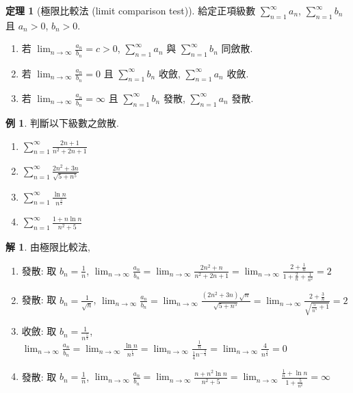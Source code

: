 \documentclass[12pt]{extarticle}
\newcommand{\ds}{\displaystyle}
\theoremstyle{definition}
\newtheorem*{thm}{定理}
\newtheorem*{ex}{例}
\newtheorem*{sol}{解}
\begin{document}
\begin{thm}[極限比較法 (limit comparison test)]
  給定正項級數 $\ds\sum_{n = 1}^\infty a_n$, $\ds\sum_{n = 1}^\infty b_n$ 且 $\ds a_n > 0$, $\ds b_n > 0$. 
  \begin{enumerate}\setlength{\itemsep}{0pt}
    \item 若 $\ds\lim_{n\to\infty}\frac{a_n}{b_n} = c > 0$, $\ds\sum_{n = 1}^\infty a_n$ 與 $\ds\sum_{n = 1}^\infty b_n$ 同斂散. 
    \item 若 $\ds\lim_{n\to\infty}\frac{a_n}{b_n} = 0$ 且 $\ds\sum_{n = 1}^\infty b_n$ 收斂, $\ds\sum_{n = 1}^\infty a_n$ 收斂. 
    \item 若 $\ds\lim_{n\to\infty}\frac{a_n}{b_n} = \infty$ 且 $\ds\sum_{n = 1}^\infty b_n$ 發散, $\ds\sum_{n = 1}^\infty a_n$ 發散. 
  \end{enumerate}
\end{thm}

\begin{ex} 判斷以下級數之斂散. 
  \begin{multicols}{4}
    \begin{enumerate}\setlength{\itemsep}{0pt}
      \item $\ds\sum_{n = 1}^\infty\frac{2 n + 1}{n^2 + 2n + 1}$
      \item $\ds\sum_{n = 1}^\infty\frac{2n^2 + 3n}{\sqrt{5 + n^5}}$
      \item $\ds\sum_{n = 1}^\infty\frac{\ln n}{n^{\frac{3}{2}}}$
      \item $\ds\sum_{n = 1}^\infty\frac{1 + n\ln n}{n^2 + 5}$
    \end{enumerate}
  \end{multicols}
\end{ex}

\begin{sol} 由極限比較法, 
  \begin{enumerate}\setlength{\itemsep}{0pt}
    \item 發散: 取 $\ds b_n = \frac{1}{n}$, $\ds\lim_{n\to\infty}\frac{a_n}{b_n} = \lim_{n\to\infty}\frac{2n^2 + n}{n^2 + 2n + 1} = \lim_{n\to\infty}\frac{2 + \frac{1}{n}}{1 + \frac{2}{n} + \frac{1}{n^2}} = 2$
    \item 發散: 取 $\ds b_n = \frac{1}{\sqrt{n}}$, $\ds\lim_{n\to\infty}\frac{a_n}{b_n} = \lim_{n\to\infty}\frac{(2n^2 + 3n)\sqrt{n}}{\sqrt{5 + n^5}} = \lim_{n\to\infty}\frac{2 + \frac{3}{n}}{\sqrt{\frac{5}{n^5} + 1}} = 2$ 
    \item 收斂: 取 $\ds b_n = \frac{1}{n^{\frac{5}{4}}}$, $\ds\lim_{n\to\infty}\frac{a_n}{b_n} = \lim_{n\to\infty}\frac{\ln n}{n^\frac{1}{4}} = \lim_{n\to\infty}\frac{\frac{1}{n}}{\frac{1}{4}n^{-\frac{3}{4}}} = \lim_{n\to\infty}\frac{4}{n^{\frac{1}{4}}} = 0$
    \item 發散: 取 $\ds b_n = \frac{1}{n}$, $\ds\lim_{n\to\infty}\frac{a_n}{b_n} = \lim_{n\to\infty}\frac{n + n^2\ln n}{n^2 + 5} = \lim_{n\to\infty}\frac{\frac{1}{n} + \ln n}{1 + \frac{5}{n^2}} = \infty$
  \end{enumerate}
\end{sol}
\end{document}
